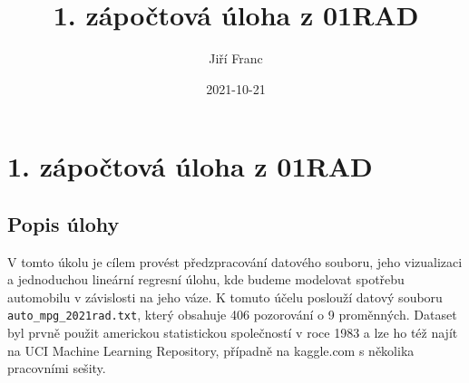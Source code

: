 \documentclass[
]{article}
\title{1. zápočtová úloha z 01RAD}
\author{Jiří Franc}
\date{2021-10-21}
\begin{document}
\maketitle

\hypertarget{zuxe1poux10dtovuxe1-uxfaloha-z-01rad}{%
\section{1. zápočtová úloha z
01RAD}\label{zuxe1poux10dtovuxe1-uxfaloha-z-01rad}}

\hypertarget{popis-uxfalohy}{%
\subsection{Popis úlohy}\label{popis-uxfalohy}}

V tomto úkolu je cílem provést předzpracování datového souboru, jeho
vizualizaci a jednoduchou lineární regresní úlohu, kde budeme modelovat
spotřebu automobilu v závislosti na jeho váze. K tomuto účelu poslouží
datový souboru \texttt{auto\_mpg\_2021rad.txt}, který obsahuje 406
pozorování o 9 proměnných. Dataset byl prvně použit americkou
statistickou společností v roce 1983 a lze ho též najít na UCI Machine
Learning Repository, případně na kaggle.com s několika pracovními
sešity.
\end{document}
